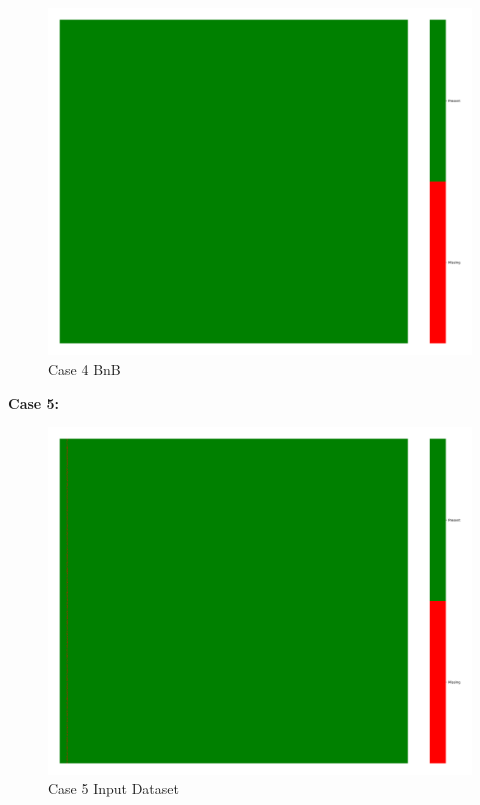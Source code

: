 \documentclass[a4paper,12pt]{article}
\begin{document}
\begin{figure}[H]
    \includegraphics[width=\linewidth]{case4_bnb_heatmap_cleaned.png}
    \caption*{Case 4 BnB}
\end{figure}

\textbf{Case 5:}
\begin{figure}[H]
    \centering
    \includegraphics[width=\linewidth]{case5_heatmap_erased.png}
    \caption*{Case 5 Input Dataset}
\end{figure}
\end{document}

